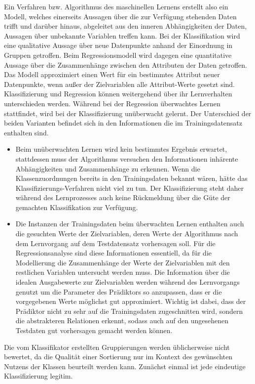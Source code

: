 \documentclass[
	12pt,
	a4paper,
	BCOR10mm,
	DIV14,
	listof=totoc,
	bibliography=totoc,
	headsepline
]{scrreprt}
\begin{document}
Ein Verfahren bzw. Algorithmus des maschinellen Lernens erstellt also ein Modell, welches einerseits Aussagen über die zur Verfügung stehenden Daten trifft und darüber hinaus, abgeleitet aus den inneren Abhängigkeiten der Daten, Aussagen über unbekannte Variablen treffen kann.
Bei der Klassifikation wird eine qualitative Aussage über neue Datenpunkte anhand der Einordnung in Gruppen getroffen.
Beim Regressionsmodell wird dagegen eine quantitative Aussage über die Zusammenhänge zwischen den Attributen der Daten getroffen. Das Modell approximiert einen Wert für ein bestimmtes Attribut neuer Datenpunkte, wenn außer der Zielvariablen alle Attribut-Werte gesetzt sind.  
Klassifizierung und Regression können weitergehend über ihr Lernverhalten unterschieden werden.
Während bei der Regression überwachtes Lernen stattfindet, wird bei der Klassifizierung unüberwacht gelernt. Der Unterschied der beiden Varianten befindet sich in den Informationen die im Trainingsdatensatz enthalten sind.
\begin{itemize}
\item Beim unüberwachten Lernen wird kein bestimmtes Ergebnis erwartet, stattdessen muss der Algorithmus versuchen den Informationen inhärente Abhängigkeiten und Zusammenhänge zu erkennen.
Wenn die Klassenzuordnungen bereits in den Trainingsdaten bekannt wären, hätte das Klassifizierungs-Verfahren nicht viel zu tun. 
Der Klassifizierung steht daher während des Lernprozesses auch keine Rückmeldung über die Güte der gemachten Klassifikation zur Verfügung.
\item Die Instanzen der Trainingsdaten beim überwachten Lernen enthalten auch die gesuchten Werte der Zielvariablen, deren Werte der Algorithmus nach dem Lernvorgang auf dem Testdatensatz vorhersagen soll.
Für die Regressionsanalyse sind diese Informationen essentiell, da für die Modellierung die Zusammenhänge der Werte der Zielvariablen mit den restlichen Variablen untersucht werden muss.
Die Information über die idealen Ausgabewerte zur Zielvariablen werden während des Lernvorgangs genutzt um die Parameter des Prädiktors so anzupassen, dass er die vorgegebenen Werte möglichst gut approximiert. Wichtig ist dabei, dass der Prädiktor nicht zu sehr auf die Trainingsdaten zugeschnitten wird, sondern die abstrakteren Relationen erkennt, sodass auch auf den ungesehenen Testdaten gut vorhersagen gemacht werden können.
\end{itemize}

Die vom Klassifikator erstellten Gruppierungen werden üblicherweise nicht bewertet, da die Qualität einer Sortierung nur im Kontext des gewünschten Nutzens der Klassen beurteilt werden kann.
Zunächst einmal ist jede eindeutige Klassifizierung legitim.
\end{document}
